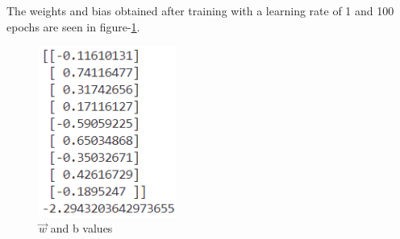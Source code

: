 \documentclass{article}
\begin{document}
            The weights and bias obtained after training with a learning rate of 1 and 100 epochs are seen in figure-\ref{fig:cancer-results}.
            \begin{figure}[H]
                \centering
                \includegraphics[width=0.4\textwidth]{cancer-results.png}
                \caption{$\vec{w}$ and b values}
                \label{fig:cancer-results}
            \end{figure}
\end{document}

